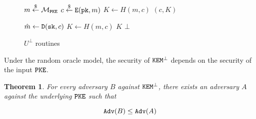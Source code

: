 \documentclass{article}
\newtheorem{theorem}{Theorem}[section]
\begin{document}
\begin{figure}[H]
    \begin{minipage}{0.49\textwidth}
        \begin{algorithm}[H]
            \caption{$\encap^\bot(\pk)$}\label{alg:u-bot-encap}
            \begin{algorithmic}[1]
                \State $m \stackrel{\$}{\leftarrow} \mathcal{M}_\texttt{PKE}$
                \State $c \stackrel{\$}{\leftarrow} \texttt{E}(\texttt{pk}, m)$
                \State $K \leftarrow H(m, c)$
                \State \Return $(c, K)$
            \end{algorithmic}
        \end{algorithm}
    \end{minipage}
    \hfill
    \begin{minipage}{0.49\textwidth}
        \begin{algorithm}[H]
            \caption{$\decap^\bot(\sk, c)$}\label{alg:u-bot-decap}
            \begin{algorithmic}[1]
                \State $\hat{m} \leftarrow \texttt{D}(\texttt{sk}, c)$
                    \State $K \leftarrow H(\hat{m}, c)$
                    \State \Return $K$
                \EndIf
                \State \Return $\bot$
            \end{algorithmic}
        \end{algorithm}
    \end{minipage}
    \caption{$U^\bot$ routines}\label{fig:u-bot-routines}
\end{figure}

Under the random oracle model, the security of $\texttt{KEM}^\bot$ depends on the security of the input $\texttt{PKE}$.

\begin{theorem}\label{thm:owpcva-implies-indcca2}
    For every  adversary $B$ against $\texttt{KEM}^\bot$, there exists an  adversary $A$ against the underlying $\texttt{PKE}$ such that

    \begin{equation*}
        \texttt{Adv}(B) \leq \texttt{Adv}(A)
    \end{equation*}
\end{theorem}
\end{document}
